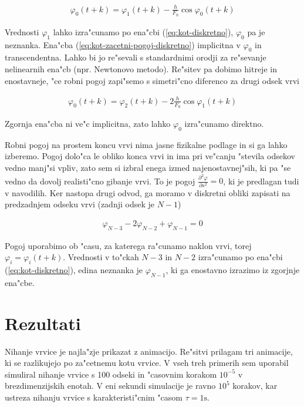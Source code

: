 \documentclass[a4paper,10pt]{article}
\renewcommand{\phi}{\varphi}
\newcommand{\parcdva}[2]{
  \frac{\partial^2 #1}{\partial #2 ^2}
}
\begin{document}
\begin{align}
 \label{eq:kot-zacetni-pogoj-diskretno}
 \phi_0(t+k) = \phi_1(t+k) - \frac{h}{F_0} \cos \phi_0(t+k)
\end{align}

Vrednosti $\phi_1$ lahko izra"cunamo po ena"cbi (\ref{eq:kot-diskretno}), $\phi_0$ pa je neznanka. Ena"cba (\ref{eq:kot-zacetni-pogoj-diskretno}) implicitna v $\phi_0$ in transcendentna. Lahko bi jo re"sevali s standardnimi orodji za re"sevanje nelinearnih ena"cb (npr. Newtonovo metodo). Re"sitev pa dobimo hitreje in enostavneje, "ce robni pogoj zapi"semo s simetri"cno diferenco za drugi odsek vrvi 

\begin{align}
 \label{eq:kot-zacetni-pogoj-diskretno-enostavno}
 \phi_0(t+k) = \phi_2(t+k) - 2\frac{h}{F_0} \cos \phi_1(t+k)
\end{align}

Zgornja ena"cba ni ve"c implicitna, zato lahko $\phi_0$ izra"cunamo direktno. 

Robni pogoj na prostem koncu vrvi nima jasne fizikalne podlage in si ga lahko izberemo. Pogoj dolo"ca le obliko konca vrvi in ima pri ve"canju "stevila odsekov vedno manj"si vpliv, zato sem si izbral enega izmed najenostavnej"sih, ki pa "se vedno da dovolj realisti"cno gibanje vrvi. To je pogoj $\parcdva{\phi}{s}=0$, ki je predlagan tudi v navodilih. Ker nastopa drugi odvod, ga moramo v diskretni obliki zapisati na predzadnjem odseku vrvi (zadnji odsek je $N-1$)

\begin{align}
 \phi_{N-3} -2\phi_{N-2} + \phi_{N-1} = 0
\end{align}

Pogoj uporabimo ob "casu, za katerega ra"cunamo naklon vrvi, torej $\phi_i = \phi_i(t+k)$. Vrednosti v to"ckah $N-3$ in $N-2$ izra"cunamo po ena"cbi (\ref{eq:kot-diskretno}), edina neznanka je $\phi_{N-1}$, ki ga enostavno izrazimo iz zgorjnje ena"cbe. 

\section{Rezultati}

Nihanje vrvice je najla"zje prikazat z animacijo. Re"sitvi prilagam tri animacije, ki se razlikujejo po za"cetnemu kotu vrvice. V vseh treh primerih sem uporabil simuliral nihanje vrvice s 100 odseki in "casovnim korakom $10^{-5}$ v brezdimenzijskih enotah. V eni sekundi simulacije je ravno $10^5$ korakov, kar ustreza nihanju vrvice s karakteristi"cnim "casom $\tau = 1\mathrm{s}$. 
\end{document}
